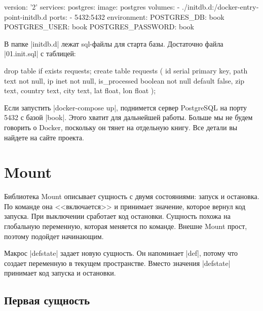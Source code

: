 \begin{english}
  \begin{yaml}
version: '2'
services:
  postgres:
    image: postgres
    volumes:
      - ./initdb.d:/docker-entrypoint-initdb.d
    ports:
      - 5432:5432
    environment:
      POSTGRES_DB: book
      POSTGRES_USER: book
      POSTGRES_PASSWORD: book
  \end{yaml}
\end{english}

В папке \spverb|initdb.d| лежат sql-файлы для старта базы. Достаточно файла
\spverb|01.init.sql| с таблицей:

\begin{english}
  \begin{sql}
drop table if exists requests;
create table requests (
    id            serial primary key,
    path          text not null,
    ip            inet not null,
    is_processed  boolean not null default false,
    zip           text,
    country       text,
    city          text,
    lat           float,
    lon           float
);
  \end{sql}
\end{english}

Если запустить \spverb|docker-compose up|, поднимется сервер PostgreSQL на порту
5432 с базой \spverb|book|. Этого хватит для дальнейшей работы. Больше мы не
будем говорить о Docker, поскольку он тянет на отдельную книгу. Все детали вы
найдете на сайте проекта.

\section{Mount}

Библиотека Mount описывает сущность с
двумя состояниями: запуск и остановка. По команде она <<включается>> и принимает
значение, которое вернул код запуска. При выключении сработает код
остановки. Сущность похожа на глобальную переменную, которая меняется по
команде. Внешне Mount прост, поэтому подойдет начинающим.

Макрос \spverb|defstate| задает новую сущность. Он напоминает \spverb|def|,
потому что создает переменную в текущем пространстве. Вместо значения
\spverb|defstate| принимает код запуска и остановки.

\subsection{Первая сущность}

